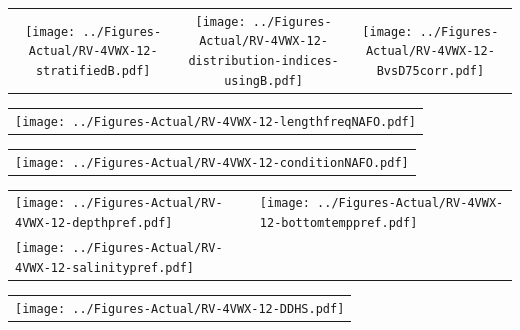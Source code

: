 \documentclass[12pt]{article}\usepackage[]{graphicx}\usepackage[]{color}
\begin{document}
\vspace{1cm}
\begin{minipage}{1.0\textwidth}
 \begin{tabular}{ccc}
\texttt{[image: ../Figures-Actual/RV-4VWX-12-stratifiedB.pdf]} & 
\texttt{[image: ../Figures-Actual/RV-4VWX-12-distribution-indices-usingB.pdf]} & 
\texttt{[image: ../Figures-Actual/RV-4VWX-12-BvsD75corr.pdf]} \\ 
\end{tabular} 
\end{minipage}
\clearpage
\begin{minipage}{1.0\textwidth}
 \begin{tabular}{c}
\texttt{[image: ../Figures-Actual/RV-4VWX-12-lengthfreqNAFO.pdf]} \\ 
\end{tabular} 
\end{minipage}
\newline

\vspace{1cm}
\begin{minipage}{1.0\textwidth}
 \begin{tabular}{c}
\texttt{[image: ../Figures-Actual/RV-4VWX-12-conditionNAFO.pdf]} \\ 
\end{tabular} 
\end{minipage}
\clearpage
\begin{minipage}{1.0\textwidth}
 \begin{tabular}[t]{m{3in}m{3in}}
\texttt{[image: ../Figures-Actual/RV-4VWX-12-depthpref.pdf]} & 
\texttt{[image: ../Figures-Actual/RV-4VWX-12-bottomtemppref.pdf]} \\ 
\texttt{[image: ../Figures-Actual/RV-4VWX-12-salinitypref.pdf]} & 
 \\ 
\end{tabular} 
\end{minipage}
\newline

\vspace{1cm}
\begin{minipage}{1.0\textwidth}
 \begin{tabular}{c}
\texttt{[image: ../Figures-Actual/RV-4VWX-12-DDHS.pdf]} \\ 
\end{tabular} 
\end{minipage}
\clearpage
\end{document}
